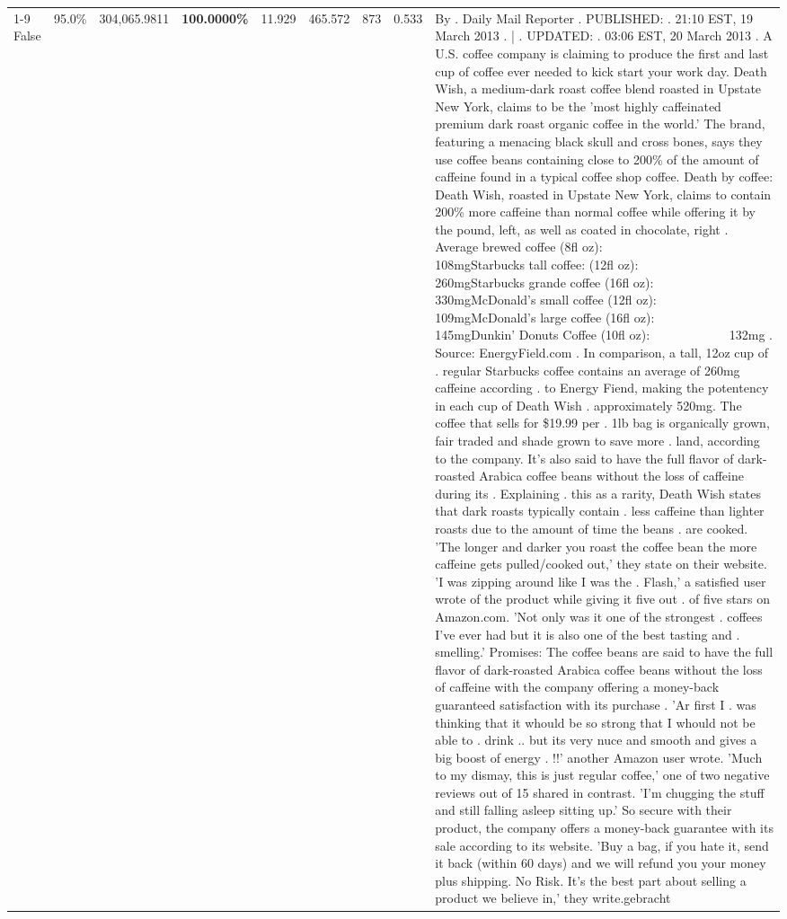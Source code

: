 \begin{table}[H]
{\begin{tabular}{lllrlllll}
\cline{1-9}
False & 95.0\% & 304,065.9811 & \bfseries \color{red} 100.0000\% & 11.929 & 465.572 & 873 & 0.533 & By . Daily Mail Reporter . PUBLISHED: . 21:10 EST, 19 March 2013 . | . UPDATED: . 03:06 EST, 20 March 2013 . A U.S. coffee company is claiming to produce the first and last cup of coffee ever needed to kick start your work day. Death Wish, a medium-dark roast coffee blend roasted in Upstate New York, claims to be the 'most highly caffeinated premium dark roast organic coffee in the world.' The brand, featuring a menacing black skull and cross bones, says they use coffee beans containing close to 200\% of the amount of caffeine found in a typical coffee shop coffee. Death by coffee: Death Wish, roasted in Upstate New York, claims to contain 200\% more caffeine than normal coffee while offering it by the pound, left, as well as coated in chocolate, right . Average brewed coffee (8fl oz):              108mgStarbucks tall coffee: (12fl oz):                260mgStarbucks grande coffee (16fl oz):         330mgMcDonald's small coffee (12fl oz):           109mgMcDonald's large coffee (16fl oz):           145mgDunkin' Donuts Coffee (10fl oz):             132mg . Source: EnergyField.com . In comparison, a tall, 12oz cup of . regular Starbucks coffee contains an average of 260mg caffeine according . to Energy Fiend, making the potentency in each cup of Death Wish . approximately 520mg. The coffee that sells for \$19.99 per . 1lb bag is organically grown, fair traded and shade grown to save more . land, according to the company. It's also said to have the full flavor of dark-roasted Arabica coffee beans without the loss of caffeine during its . Explaining . this as a rarity, Death Wish states that dark roasts typically contain . less caffeine than lighter roasts due to the amount of time the beans . are cooked. 'The longer and darker you roast the coffee bean the more caffeine gets pulled/cooked out,' they state on their website. 'I was zipping around like I was the . Flash,' a satisfied user wrote of the product while giving it five out . of five stars on Amazon.com. 'Not only was it one of the strongest . coffees I've ever had but it is also one of the best tasting and . smelling.’ Promises: The coffee beans are said to have the full flavor of dark-roasted Arabica coffee beans without the loss of caffeine with the company offering a money-back guaranteed satisfaction with its purchase . 'Ar first I . was thinking that it whould be so strong that I whould not be able to . drink .. but its very nuce and smooth and gives a big boost of energy . !!' another Amazon user wrote. 'Much to my dismay, this is just regular coffee,' one of two negative reviews out of 15 shared in contrast. 'I'm chugging the stuff and still falling asleep sitting up.' So secure with their product, the company offers a money-back guarantee with its sale according to its website. 'Buy a bag, if you hate it, send it back (within 60 days) and we will refund you your money plus shipping. No Risk. It’s the best part about selling a product we believe in,' they write.gebracht \\

\end{tabular}}
\end{table}
